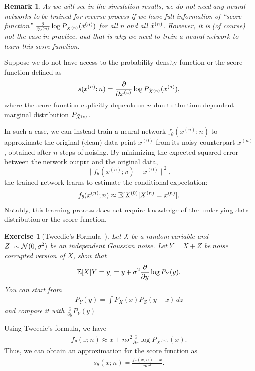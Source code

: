 \documentclass[11pt, a4paper]{article}
\newtheorem{exercise}{Exercise}
\newtheorem{remark}{Remark}
\begin{document}
\begin{remark}
    As we will see in the simulation results, we do not need any neural networks to be trained for reverse process
    if we have full information of ``score function'' $\frac{\partial}{\partial \tilde{x}^{(n)}} \log P_{\tilde{X}^{(n)}} (\tilde{x}^{(n)})$ for all $n$ and all $\tilde{x}^{(n)}$.
    However, it is (of course) not the case in practice, and that is why we need to train a neural network to learn this score function.
\end{remark}



Suppose we do not have access to the probability density function or the score function defined as  
\[
s(x^{(n)}; n) = \frac{\partial}{\partial x^{(n)}} \log P_{\tilde{X}^{(n)}} (x^{(n)}),
\]
where the score function explicitly depends on \(n\) due to the time-dependent marginal distribution \(P_{\tilde{X}^{(n)}}\).

In such a case, we can instead train a neural network \(f_\theta(x^{(n)}; n)\) to approximate the original (clean) data point \(x^{(0)}\) from its noisy counterpart \(x^{(n)}\), obtained after \(n\) steps of noising. By minimizing the expected squared error between the network output and the original data,
\[
\|f_\theta(x^{(n)}; n) - x^{(0)}\|^2,
\]
the trained network learns to estimate the conditional expectation:
\[
f_{\theta}(x^{(n)};n) \approx \mathbb{E}[X^{(0)} | X^{(n)} = x^{(n)}].
\]
Notably, this learning process does not require knowledge of the underlying data distribution or the score function.


\begin{exercise}[Tweedie's Formula~\cite{efron2011tweedie}]
    Let $X$ be a random variable and $Z~\sim{\cal N}(0, \sigma^2)$ be an independent Gaussian noise.
    Let $Y= X+Z$ be noise corrupted version of $X$, show that
    \begin{align}
        \mathbb{E}[X|Y=y]  = y + \sigma^2 \frac{\partial}{\partial y} \log P_{Y}(y).
    \end{align}
    You can start from 
    \begin{align}
        P_Y(y) = \int P_X(x) P_Z(y-x)\, dz 
    \end{align}
    and compare it with $\frac{\partial}{\partial y} P_Y(y)$
\end{exercise}

Using Tweedie's formula, we have
\begin{align}
    f_{\theta}(x;n) \approx x + n\sigma^2 \frac{\partial}{\partial x} \log P_{X^{(n)}}(x).
\end{align}
Thus, we can obtain an approximation for the score function as
\begin{align}
    s_\theta(x;n) = \frac{f_{\theta}(x; n) - x}{n\sigma^2}.
\end{align}
\end{document}
